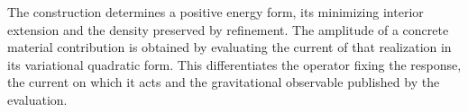 The construction determines a positive energy form, its minimizing
interior extension and the density preserved by refinement.
The amplitude of a concrete material contribution is obtained by evaluating
the current of that realization in its variational quadratic form.
This differentiates the operator fixing the response, the current
on which it acts and the gravitational observable published by the evaluation.
